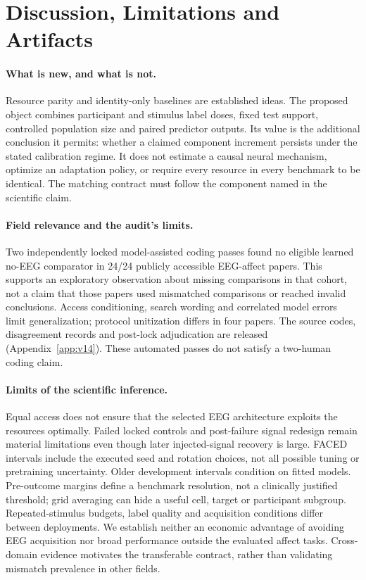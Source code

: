 \documentclass{article}
\begin{document}


\section{Discussion, Limitations and Artifacts}
\paragraph{What is new, and what is not.}
Resource parity and identity-only baselines are established ideas. The proposed
object combines participant and stimulus label doses, fixed test support,
controlled population size and paired predictor outputs. Its value is the
additional conclusion it permits: whether a claimed component increment
persists under the stated calibration regime. It does not estimate a causal
neural mechanism, optimize an adaptation policy, or require every resource in
every benchmark to be identical. The matching contract must follow the
component named in the scientific claim.

\paragraph{Field relevance and the audit's limits.}
Two independently locked model-assisted coding passes found no eligible
learned no-EEG comparator in 24/24 publicly accessible EEG-affect papers.
This supports an exploratory observation about missing comparisons in that
cohort, not a claim that those papers used mismatched comparisons or reached
invalid conclusions. Access conditioning, search wording and correlated model
errors limit generalization; protocol unitization differs in four papers.
The source codes, disagreement records and post-lock adjudication are released
(Appendix~\ref{app:v14}). These automated passes do not satisfy a two-human
coding claim.

\paragraph{Limits of the scientific inference.}
Equal access does not ensure that the selected EEG architecture exploits the
resources optimally. Failed locked controls and post-failure signal redesign
remain material limitations even though later injected-signal recovery is
large. FACED intervals include the executed seed and rotation choices, not all
possible tuning or pretraining uncertainty. Older development intervals
condition on fitted models. Pre-outcome margins define a benchmark resolution,
not a clinically justified threshold; grid averaging can hide a useful cell,
target or participant subgroup. Repeated-stimulus budgets, label quality and
acquisition conditions differ between deployments. We establish neither an
economic advantage of avoiding EEG acquisition nor broad performance outside
the evaluated affect tasks. Cross-domain evidence motivates the transferable
contract, rather than validating mismatch prevalence in other fields.
\end{document}
